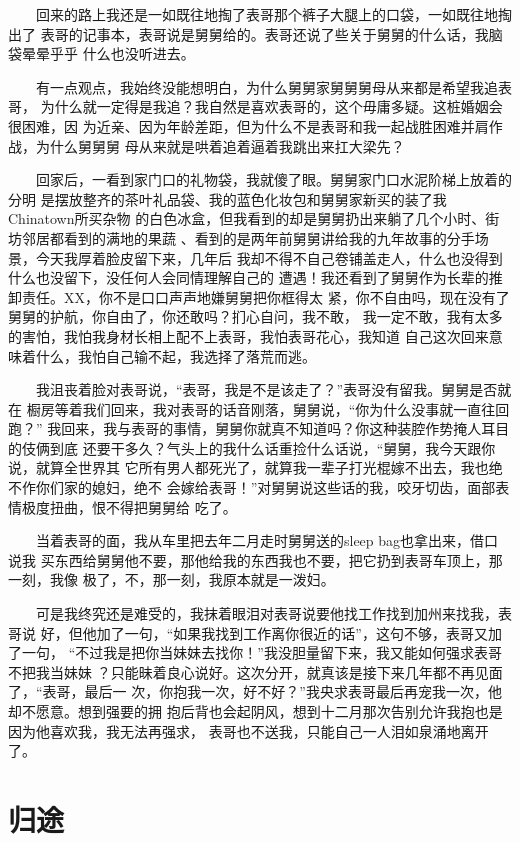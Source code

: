 \documentclass[12pt]{book}
\begin{document}
　　回来的路上我还是一如既往地掏了表哥那个裤子大腿上的口袋，一如既往地掏出了
表哥的记事本，表哥说是舅舅给的。表哥还说了些关于舅舅的什么话，我脑袋晕晕乎乎
什么也没听进去。

　　有一点观点，我始终没能想明白，为什么舅舅家舅舅舅母从来都是希望我追表哥，
为什么就一定得是我追？我自然是喜欢表哥的，这个毋庸多疑。这桩婚姻会很困难，因
为近亲、因为年龄差距，但为什么不是表哥和我一起战胜困难并肩作战，为什么舅舅舅
母从来就是哄着追着逼着我跳出来扛大梁先？

　　回家后，一看到家门口的礼物袋，我就傻了眼。舅舅家门口水泥阶梯上放着的分明
是摆放整齐的茶叶礼品袋、我的蓝色化妆包和舅舅家新买的装了我Chinatown所买杂物
的白色冰盒，但我看到的却是舅舅扔出来躺了几个小时、街坊邻居都看到的满地的果蔬
、看到的是两年前舅舅讲给我的九年故事的分手场景，今天我厚着脸皮留下来，几年后
我却不得不自己卷铺盖走人，什么也没得到什么也没留下，没任何人会同情理解自己的
遭遇！我还看到了舅舅作为长辈的推卸责任。XX，你不是口口声声地嫌舅舅把你框得太
紧，你不自由吗，现在没有了舅舅的护航，你自由了，你还敢吗？扪心自问，我不敢，
我一定不敢，我有太多的害怕，我怕我身材长相上配不上表哥，我怕表哥花心，我知道
自己这次回来意味着什么，我怕自己输不起，我选择了落荒而逃。

　　我沮丧着脸对表哥说，“表哥，我是不是该走了？”表哥没有留我。舅舅是否就在
橱房等着我们回来，我对表哥的话音刚落，舅舅说，“你为什么没事就一直往回跑？”
我回来，我与表哥的事情，舅舅你就真不知道吗？你这种装腔作势掩人耳目的伎俩到底
还要干多久？气头上的我什么话重捡什么话说，“舅舅，我今天跟你说，就算全世界其
它所有男人都死光了，就算我一辈子打光棍嫁不出去，我也绝不作你们家的媳妇，绝不
会嫁给表哥！”对舅舅说这些话的我，咬牙切齿，面部表情极度扭曲，恨不得把舅舅给
吃了。

　　当着表哥的面，我从车里把去年二月走时舅舅送的sleep bag也拿出来，借口说我
买东西给舅舅他不要，那他给我的东西我也不要，把它扔到表哥车顶上，那一刻，我像
极了，不，那一刻，我原本就是一泼妇。

　　可是我终究还是难受的，我抹着眼泪对表哥说要他找工作找到加州来找我，表哥说
好，但他加了一句，“如果我找到工作离你很近的话”，这句不够，表哥又加了一句，
“不过我是把你当妹妹去找你！”我没胆量留下来，我又能如何强求表哥不把我当妹妹
？只能昧着良心说好。这次分开，就真该是接下来几年都不再见面了，“表哥，最后一
次，你抱我一次，好不好？”我央求表哥最后再宠我一次，他却不愿意。想到强要的拥
抱后背也会起阴风，想到十二月那次告别允许我抱也是因为他喜欢我，我无法再强求，
表哥也不送我，只能自己一人泪如泉涌地离开了。
\section{归途}
\label{sec-8-18}
\end{document}
